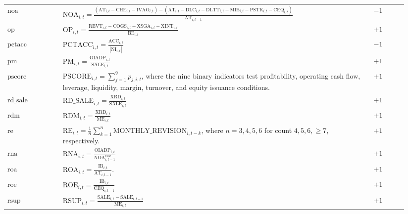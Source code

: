 \documentclass[11pt]{article}
\begin{document}
\begin{landscape}
\begin{longtable}{p{0.13\linewidth}p{0.73\linewidth}p{0.08\linewidth}}
\(\mathrm{noa}\) &
\(\displaystyle \mathrm{NOA}_{i,t}=
\frac{(\mathrm{AT}_{i,t}-\mathrm{CHE}_{i,t}-\mathrm{IVAO}_{i,t})
-(\mathrm{AT}_{i,t}-\mathrm{DLC}_{i,t}-\mathrm{DLTT}_{i,t}-\mathrm{MIB}_{i,t}-\mathrm{PSTK}_{i,t}-\mathrm{CEQ}_{i,t})}
{\mathrm{AT}_{i,t-1}}\)  & \(-1\)\\

\(\mathrm{op}\) &
\(\displaystyle \mathrm{OP}_{i,t}=\frac{\mathrm{REVT}_{i,t}-\mathrm{COGS}_{i,t}-\mathrm{XSGA}_{i,t}-\mathrm{XINT}_{i,t}}{\mathrm{BE}_{i,t}}\)  & \(+1\)\\

\(\mathrm{pctacc}\) &
\(\displaystyle \mathrm{PCTACC}_{i,t}=\frac{\mathrm{ACC}_{i,t}}{|\mathrm{NI}_{i,t}|}\)  & \(-1\)\\

\(\mathrm{pm}\) &
\(\displaystyle \mathrm{PM}_{i,t}=\frac{\mathrm{OIADP}_{i,t}}{\mathrm{SALE}_{i,t}}\)  & \(+1\)\\

\(\mathrm{pscore}\) &
\(\displaystyle \mathrm{PSCORE}_{i,t}=\sum_{j=1}^{9}p_{j,i,t}\), where the nine
binary indicators test profitability, operating cash flow, leverage, liquidity,
margin, turnover, and equity issuance conditions.  & \(+1\)\\

\(\mathrm{rd\_sale}\) &
\(\displaystyle \mathrm{RD\_SALE}_{i,t}=\frac{\mathrm{XRD}_{i,t}}{\mathrm{SALE}_{i,t}}\)  & \(+1\)\\

\(\mathrm{rdm}\) &
\(\displaystyle \mathrm{RDM}_{i,t}=\frac{\mathrm{XRD}_{i,t}}{\mathrm{ME}_{i,t}}\)  & \(+1\)\\

\(\mathrm{re}\) &
\(\displaystyle \mathrm{RE}_{i,t}=\frac{1}{n}\sum_{k=1}^{n}\mathrm{MONTHLY\_REVISION}_{i,t-k}\),
where \(n=3,4,5,6\) for count \(4,5,6,\ge 7\), respectively.  & \(+1\)\\

\(\mathrm{rna}\) &
\(\displaystyle \mathrm{RNA}_{i,t}=\frac{\mathrm{OIADP}_{i,t}}{\mathrm{NOA}^{raw}_{i,t-1}}\)  & \(+1\)\\

\(\mathrm{roa}\) &
\(\displaystyle \mathrm{ROA}_{i,t}=\frac{\mathrm{IB}_{i,t}}{\mathrm{AT}_{i,t-1}}\).  & \(+1\)\\

\(\mathrm{roe}\) &
\(\displaystyle \mathrm{ROE}_{i,t}=\frac{\mathrm{IB}_{i,t}}{\mathrm{CEQ}_{i,t-1}}\)  & \(+1\)\\

\(\mathrm{rsup}\) &
\(\displaystyle \mathrm{RSUP}_{i,t}=\frac{\mathrm{SALE}_{i,t}-\mathrm{SALE}_{i,t-1}}{\mathrm{ME}_{i,t}}\)  & \(+1\)\\


\end{longtable}
\end{landscape}
\end{document}
